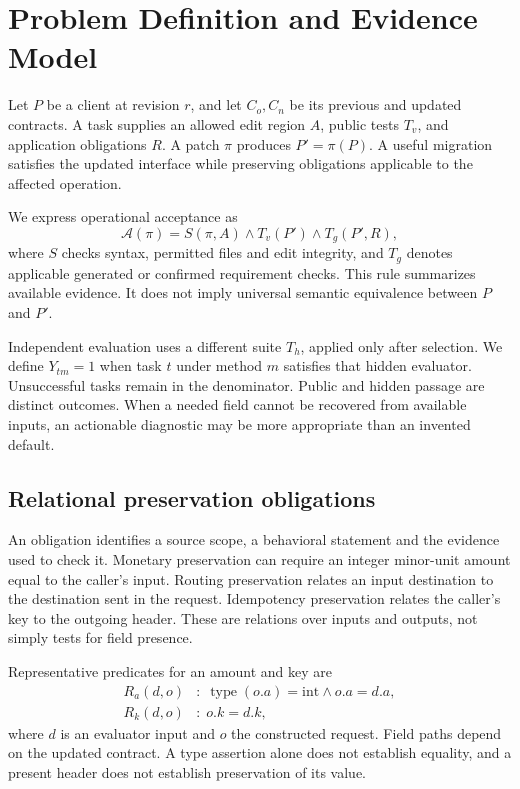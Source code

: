 \section{Problem Definition and Evidence Model}
Let $P$ be a client at revision $r$, and let $C_o,C_n$ be its previous and updated contracts. A task supplies an allowed edit region $A$, public tests $T_v$, and application obligations $R$. A patch $\pi$ produces $P'=\pi(P)$. A useful migration satisfies the updated interface while preserving obligations applicable to the affected operation.

We express operational acceptance as
\begin{equation}
\mathcal A(\pi)=S(\pi,A)\land T_v(P')\land T_g(P',R),
\label{eq:accept}
\end{equation}
where $S$ checks syntax, permitted files and edit integrity, and $T_g$ denotes applicable generated or confirmed requirement checks. This rule summarizes available evidence. It does not imply universal semantic equivalence between $P$ and $P'$.

Independent evaluation uses a different suite $T_h$, applied only after selection. We define $Y_{tm}=1$ when task $t$ under method $m$ satisfies that hidden evaluator. Unsuccessful tasks remain in the denominator. Public and hidden passage are distinct outcomes. When a needed field cannot be recovered from available inputs, an actionable diagnostic may be more appropriate than an invented default.

\ifAccess
\subsection{Relational preservation obligations}
An obligation identifies a source scope, a behavioral statement and the evidence used to check it. Monetary preservation can require an integer minor-unit amount equal to the caller's input. Routing preservation relates an input destination to the destination sent in the request. Idempotency preservation relates the caller's key to the outgoing header. These are relations over inputs and outputs, not simply tests for field presence.

Representative predicates for an amount and key are
\begin{align}
R_a(d,o)&:\;\operatorname{type}(o.a)=\mathrm{int}\land o.a=d.a,\\
R_k(d,o)&:\;o.k=d.k,
\end{align}
where $d$ is an evaluator input and $o$ the constructed request. Field paths depend on the updated contract. A type assertion alone does not establish equality, and a present header does not establish preservation of its value.

